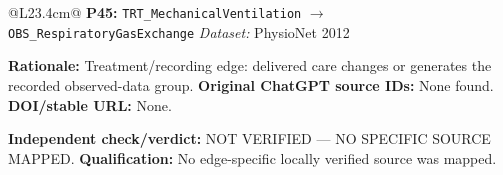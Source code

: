 \begin{tabular}{@{}L{23.4cm}@{}}
\addlinespace[2pt]
\midrule
\textbf{P45:} \nolinkurl{TRT_MechanicalVentilation} $\rightarrow$ \nolinkurl{OBS_RespiratoryGasExchange} \hfill \textit{Dataset:} PhysioNet 2012\par\textbf{Rationale:} Treatment/recording edge: delivered care changes or generates the recorded observed-data group. \textbf{Original ChatGPT source IDs:} None found. \textbf{DOI/stable URL:} None.\par\textbf{Independent check/verdict:} NOT VERIFIED --- NO SPECIFIC SOURCE MAPPED. \textbf{Qualification:} No edge-specific locally verified source was mapped. \\
\addlinespace[2pt]
\midrule
\bottomrule
\end{tabular}
